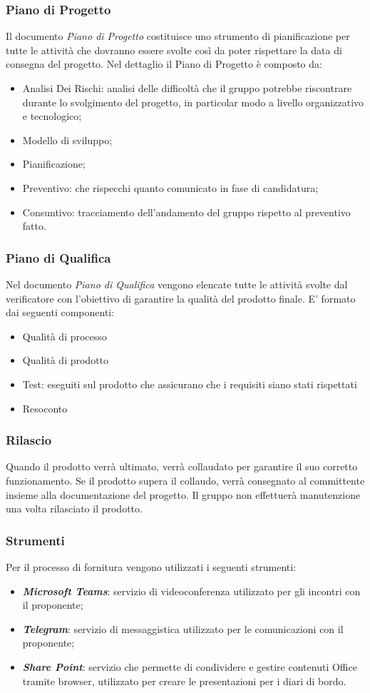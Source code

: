 \subsubsection{Piano di Progetto}
Il documento \textit{Piano di Progetto} costituisce uno strumento di pianificazione per tutte le attività che dovranno essere svolte così da poter rispettare la data di consegna del progetto.
Nel dettaglio il Piano di Progetto è composto da:
\begin{itemize}
    \item Analisi Dei Rischi: analisi delle difficoltà che il gruppo potrebbe riscontrare durante lo svolgimento del progetto, in particolar modo a livello organizzativo e tecnologico;
    \item Modello di sviluppo;
    \item Pianificazione;
    \item Preventivo: che rispecchi quanto comunicato in fase di candidatura;
    \item Consuntivo: tracciamento dell'andamento del gruppo rispetto al preventivo fatto.
\end{itemize}
\subsubsection{Piano di Qualifica}
Nel documento \textit{Piano di Qualifica} vengono elencate tutte le attività svolte dal verificatore con l'obiettivo di garantire la qualità del prodotto finale.
E' formato dai seguenti componenti:
\begin{itemize}
    \item Qualità di processo
    \item Qualità di prodotto
    \item Test: eseguiti sul prodotto che assicurano che i requisiti siano stati rispettati
    \item Resoconto
\end{itemize}
\subsubsection{Rilascio}
Quando il prodotto verrà ultimato, verrà collaudato per garantire il suo corretto funzionamento. Se il prodotto supera il collaudo, verrà consegnato al committente insieme alla documentazione del progetto. 
Il gruppo non effettuerà manutenzione una volta rilasciato il prodotto.
\subsubsection{Strumenti}
Per il processo di fornitura vengono utilizzati i seguenti strumenti:
\begin{itemize}
    \item \emph{\textbf{Microsoft Teams}}: servizio di videoconferenza utilizzato per gli incontri con il proponente;
    \item \emph{\textbf{Telegram}}: servizio di messaggistica utilizzato per le comunicazioni con il proponente;
    \item \emph{\textbf{Share Point}}: servizio che permette di condividere e gestire contenuti Office tramite browser, utilizzato per creare le presentazioni per i diari di bordo.
\end{itemize}

